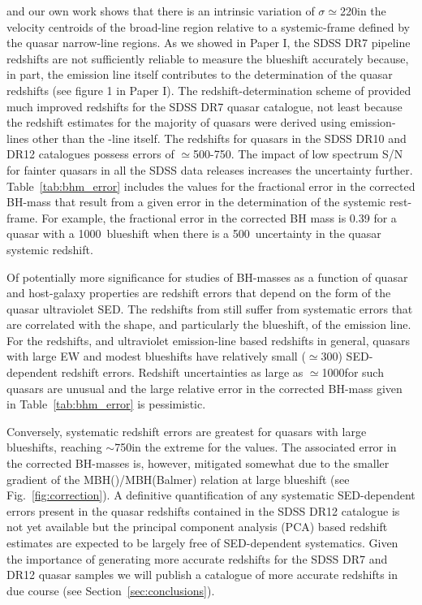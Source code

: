 \citet{shen16b} and our own work shows that there is an intrinsic variation of $\sigma$$\simeq$220\kms in the velocity centroids of the broad-line region relative to a systemic-frame defined by the quasar narrow-line regions. 
As we showed in Paper I, the SDSS DR7 pipeline redshifts are not sufficiently reliable to measure the  blueshift accurately because, in part, the  emission line itself contributes to the determination of the quasar redshifts (see figure 1 in Paper I).
The redshift-determination scheme of \citet{hewett10} provided much improved redshifts for the SDSS DR7 quasar catalogue, not least because the redshift estimates for the majority of quasars were derived using emission-lines other than the -line itself.
The redshifts for quasars in the SDSS DR10 and DR12 catalogues \citep{paris14,paris17} possess errors of $\simeq$500-750\kms \citep{paris12, font-ribera13}. The impact of low spectrum S/N for fainter quasars in all the SDSS data releases increases the uncertainty further. 
Table~\ref{tab:bhm_error} includes the values for the fractional error in the corrected BH-mass that result from a given error in the determination of the systemic rest-frame. 
For example, the fractional error in the corrected BH mass is 0.39 for a quasar with a 1000\kms\,  blueshift when there is a 500\kms\, uncertainty in the quasar systemic redshift.   

Of potentially more significance for studies of BH-masses as a function of quasar and host-galaxy properties are redshift errors that depend on the form of the quasar ultraviolet SED.
The redshifts from \citet{hewett10} still suffer from systematic errors that are correlated with the shape, and particularly the blueshift, of the  emission line.
For the \citet{hewett10} redshifts, and ultraviolet emission-line based redshifts in general, quasars with large  EW and modest blueshifts have relatively small ($\simeq$300\kms) SED-dependent redshift errors.
Redshift uncertainties as large as $\simeq$1000\kms for such quasars are unusual and the large relative error in the corrected  BH-mass given in Table~\ref{tab:bhm_error} is pessimistic. 

Conversely, systematic redshift errors are greatest for quasars with large blueshifts, reaching $\sim$750\kms in the extreme for the \citet{hewett10} values. The associated error in the corrected  BH-masses is, however, mitigated somewhat due to the smaller gradient of the MBH()/MBH(Balmer) relation at large  blueshift (see Fig.~\ref{fig:correction}).
A definitive quantification of any systematic SED-dependent errors present in the quasar redshifts contained in the SDSS DR12 catalogue is not yet available but the principal component analysis (PCA) based redshift estimates are expected to be largely free of SED-dependent systematics. 
Given the importance of generating more accurate redshifts for the SDSS DR7 and DR12 quasar samples we will publish a catalogue of more accurate redshifts in due course (see Section~\ref{sec:conclusions}).


